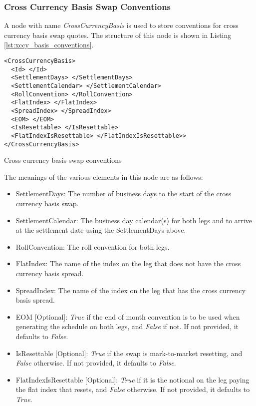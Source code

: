 \subsubsection{Cross Currency Basis Swap Conventions}
A node with name \emph{CrossCurrencyBasis} is used to store conventions for cross currency basis swap quotes. The
structure of this node is shown in Listing \ref{lst:xccy_basis_conventions}.

\begin{listing}[H]
\begin{verbatim}
<CrossCurrencyBasis>
  <Id> </Id>
  <SettlementDays> </SettlementDays>
  <SettlementCalendar> </SettlementCalendar>
  <RollConvention> </RollConvention>
  <FlatIndex> </FlatIndex>
  <SpreadIndex> </SpreadIndex>
  <EOM> </EOM>
  <IsResettable> </IsResettable>
  <FlatIndexIsResettable> </FlatIndexIsResettable>>
</CrossCurrencyBasis>
\end{verbatim}
\caption{Cross currency basis swap conventions}
\label{lst:xccy_basis_conventions}
\end{listing}


The meanings of the various elements in this node are as follows:
\begin{itemize}
\item SettlementDays: The number of business days to the start of the cross currency basis swap.
\item SettlementCalendar: The business day calendar(s) for both legs and to arrive at the settlement date using the
SettlementDays above.
\item RollConvention: The roll convention for both legs.
\item FlatIndex: The name of the index on the leg that does not have the cross currency basis spread.
\item SpreadIndex: The name of the index on the leg that has the cross currency basis spread.
\item EOM [Optional]: \emph{True} if the end of month convention is to be used when generating the schedule on both legs, and \emph{False} if not. If not provided, it defaults to \emph{False}.
\item IsResettable [Optional]: \emph{True} if the swap is mark-to-market resetting, and \emph{False} otherwise. If not provided, it defaults to \emph{False}.
\item FlatIndexIsResettable [Optional]: \emph{True} if it is the notional on the leg paying the flat index that resets, and \emph{False} otherwise. If not provided, it defaults to \emph{True}.
\end{itemize}

